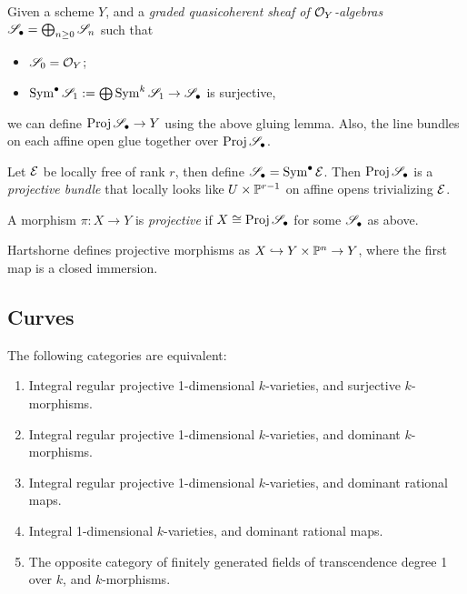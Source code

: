 \documentclass[11pt]{amsart}
\begin{document}
Given a scheme $Y$, and a \emph{graded quasicoherent sheaf of $\mathcal{O}_Y$-algebras} $\mathscr{S}_\bullet = \bigoplus_{n\ge 0} \mathscr{S}_n$ such that
\begin{itemize}
    \item $\mathscr{S}_0 = \mathcal{O}_Y$;
    \item $\operatorname{Sym}^{\bullet} \mathscr{S}_1 := \bigoplus \operatorname{Sym}^k \mathscr{S}_1 \to \mathscr{S}_\bullet$ is surjective,
\end{itemize}
we can define $\operatorname{Proj} \mathscr{S}_\bullet\to Y$ using the above gluing lemma. Also, the line bundles on each affine open glue together over $\operatorname{Proj} \mathscr{S}_\bullet$.


\begin{exm}
    Let $\mathcal{E}$ be locally free of rank $r$, then define $\mathscr{S}_\bullet = \operatorname{Sym}^\bullet \mathcal{E}$. Then $\operatorname{Proj} \mathscr{S}_\bullet$ is a \emph{projective bundle} that locally looks like $U\times \mathbb{P}^{r-1}$ on affine opens trivializing $\mathcal{E}$.
\end{exm}

\begin{defn}
    A morphism $\pi:X\to Y$ is \emph{projective} if $X \cong \operatorname{Proj} \mathscr{S}_\bullet$ for some $\mathscr{S}_\bullet$ as above. 
\end{defn}

\begin{Rem}
Hartshorne defines projective morphisms as $X\hookrightarrow Y\times \mathbb{P}^n\to Y$, where the first map is a closed immersion. 
\end{Rem}


\subsection{Curves}

\begin{thm}
\label{CurvesCategoriesEquiv}
The following categories are equivalent:
\begin{enumerate}
\item Integral regular projective 1-dimensional $k$-varieties, and surjective $k$-morphisms.
\item Integral regular projective 1-dimensional $k$-varieties, and dominant $k$-morphisms.
\item Integral regular projective 1-dimensional $k$-varieties, and dominant rational maps.
\item Integral 1-dimensional $k$-varieties, and dominant rational maps.
\item The opposite category of finitely generated fields of transcendence degree 1 over $k$, and $k$-morphisms.
\end{enumerate}
\end{thm}
\end{document}

